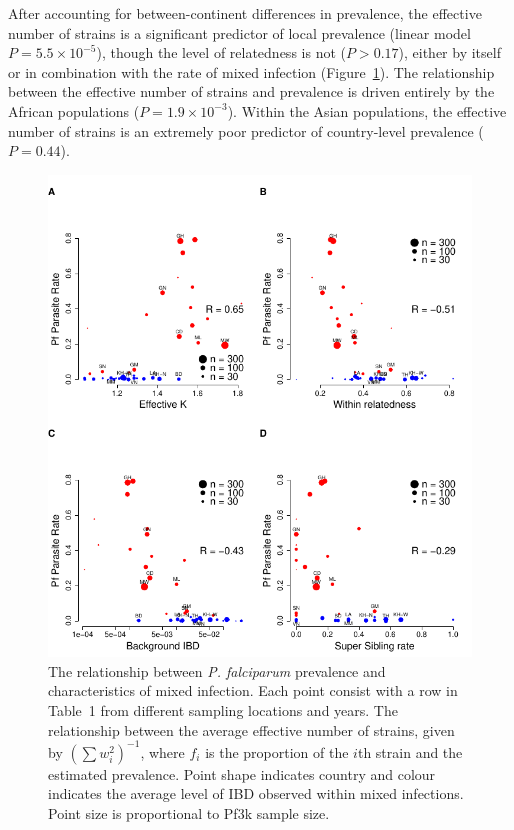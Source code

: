 \documentclass[9pt,lineno]{elife}
\begin{document}
After accounting for between-continent differences in prevalence, the effective number of strains is a significant predictor of local prevalence (linear model $P = 5.5 \times 10^{-5}$), though the level of relatedness is not ($P>0.17$), either by itself or in combination with the rate of mixed infection (Figure~\ref{fig:model}).  The relationship between the effective number of strains and prevalence is driven entirely by the African populations ($P = 1.9\times10^{-3}$). Within the Asian populations,  the effective number of strains is an extremely poor predictor of country-level prevalence ($P = 0.44$).


\begin{figure}[ht]
  \centering{}
  \includegraphics[width=.6\textwidth]{Fig5.pdf}
  \caption{The relationship between {\it P. falciparum} prevalence and characteristics of mixed infection. Each point consist with a row in Table~1 from different sampling locations and years. The relationship between the average effective number of strains, given by $(\sum w_i^2)^{-1}$, where $f_i$ is the proportion of the $i$th strain and the estimated prevalence.  Point shape indicates country and colour indicates the average level of IBD observed within mixed infections. Point size is proportional to Pf3k sample size.}
  \label{fig:model}
\end{figure}

\end{document}
